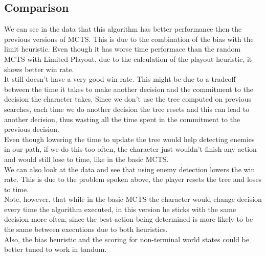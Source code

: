 \documentclass{article}
\begin{document}
  \subsection{Comparison}
  We can see in the data that this algorithm has better performance then the previous versions of MCTS. This is due to the combination of the bias with the limit heuristic.
  Even though it has worse time performace than the random MCTS with Limited Playout, due to the calculation of the playout heuristic, it shows better win rate. \\
  It still doesn't have a very good win rate. This might be due to a tradeoff between the time it takes to make another decision and the commitment to the decision the
  character takes. Since we don't use the tree computed on previous searches, each time we do another decision the tree resets and this can lead to another decision,
  thus wasting all the time spent in the commitment to the previous decision.\\ 
  Even though lowering the time to update the tree would help detecting enemies in our path, if we do this too often, the character just wouldn't finish any action 
  and would still lose to time, like in the basic MCTS.\\
  We can also look at the data and see that using enemy detection lowers the win rate. This is due to the problem spoken above, the player resets the tree and loses
  to time.\\
  Note, however, that while in the basic MCTS the character would change decision every time the algorithm executed, in this version he sticks with the same 
  decision more often, since the best action being determined is more likely to be the same between executions due to both heuristics.\\
  Also, the bias heuristic and the scoring for non-terminal world states could be better tuned to work in tandum. \\
\end{document}
